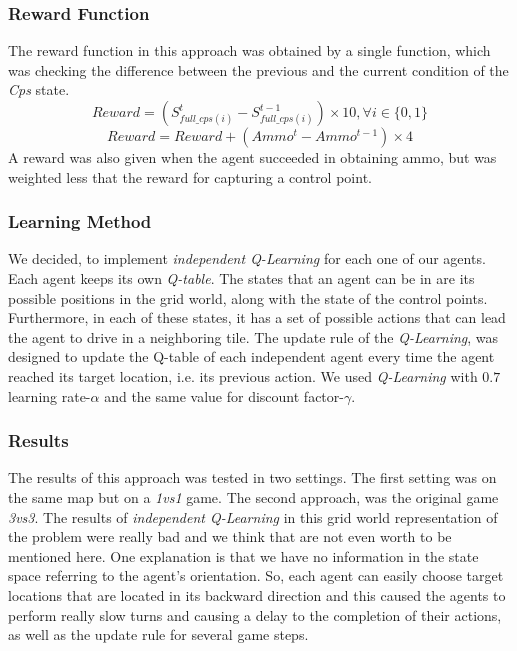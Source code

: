 \documentclass[conference]{IEEEtran}
\begin{document}
\subsubsection{Reward Function}
The reward function in this approach was obtained by a single function, which was checking the difference between the previous and the current condition of the \textit{Cps} state.
\begin{equation}
Reward = (S^{t}_{full\_cps(i)} - S^{t-1}_{full\_cps(i)}) \times 10, \forall i \in \lbrace 0,1 \rbrace
\end{equation}
\begin{equation}
Reward = Reward + (Ammo^{t} - Ammo^{t-1}) \times 4
\end{equation}
A reward was also given when the agent succeeded in obtaining ammo, but was weighted less that the reward for capturing a control point.

\subsubsection{Learning Method}
We decided, to implement \textit{independent Q-Learning} for each one of our agents. Each agent keeps its own \textit{Q-table}. The states that an agent can be in are its possible positions in the grid world, along with the state of the control points. Furthermore, in each of these states, it has a set of possible actions that can lead the agent to drive in a neighboring tile. The update rule of the \textit{Q-Learning}, was designed to update the Q-table of each independent agent every time the agent reached its target location, i.e. its previous action. We used \textit{Q-Learning} with $0.7$ learning rate-$\alpha$ and the same value for discount factor-$\gamma$.

\subsubsection{Results}
The results of this approach was tested in two settings. The first setting was on the same map but on a \emph{1vs1} game. The second approach, was the original game \emph{3vs3}. The results of \textit{independent Q-Learning} in this grid world representation of the problem were really bad and we think that are not even worth to be mentioned here. One explanation is that we have no information in the state space referring to the agent's orientation. So, each agent can easily choose target locations that are located in its backward direction and this caused the agents to perform really slow turns and causing a delay to the completion of their actions, as well as the update rule for several game steps.
\end{document}
